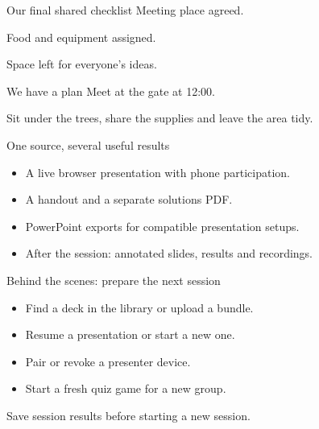 \documentclass[aspectratio=169,11pt]{beamer}
\newcommand{\say}[1]{{\Large #1}\par}
\newcommand{\smallgap}{\par\vspace{4mm}}
\begin{document}
\begin{frame}{Our final shared checklist}
  \say{Meeting place agreed.}\smallgap
  \say{Food and equipment assigned.}\smallgap
  \say{Space left for everyone's ideas.}
\end{frame}
\begin{frame}{We have a plan}
  \say{Meet at the gate at 12:00.}
  \smallgap Sit under the trees, share the supplies and leave the area tidy.\par
  \vspace{7mm}
  \hyperlink{map}{}\qquad
  \href{https://www.latex-project.org/}{}
\end{frame}
\quizpodiumframe[note={Feature example: hyperlinks and final standings. These notes are visible in the presenter view.}]
\begin{frame}{One source, several useful results}
  \begin{itemize}
    \item A live browser presentation with phone participation.
    \item A handout and a separate solutions PDF.
    \item PowerPoint exports for compatible presentation setups.
    \item After the session: annotated slides, results and recordings.
  \end{itemize}
  \smallgap \say{The content stays in a readable LaTeX file.}
\end{frame}
\appendix
\begin{frame}{Behind the scenes: prepare the next session}
  \begin{itemize}
    \item Find a deck in the library or upload a bundle.
    \item Resume a presentation or start a new one.
    \item Pair or revoke a presenter device.
    \item Start a fresh quiz game for a new group.
  \end{itemize}
  \smallgap Save session results before starting a new session.
\end{frame}
\end{document}
